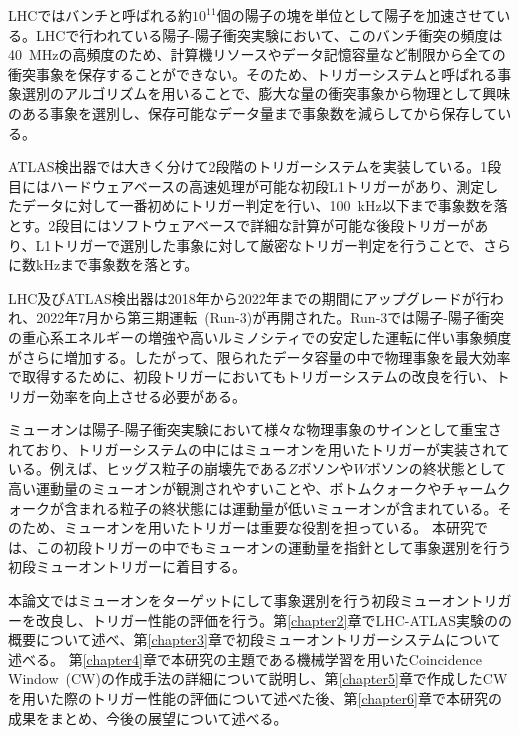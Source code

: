 LHCではバンチと呼ばれる約$10^{11}$個の陽子の塊を単位として陽子を加速させている。LHCで行われている陽子-陽子衝突実験において、このバンチ衝突の頻度は40~MHzの高頻度のため、計算機リソースやデータ記憶容量など制限から全ての衝突事象を保存することができない。そのため、トリガーシステムと呼ばれる事象選別のアルゴリズムを用いることで、膨大な量の衝突事象から物理として興味のある事象を選別し、保存可能なデータ量まで事象数を減らしてから保存している。

ATLAS検出器では大きく分けて2段階のトリガーシステムを実装している。1段目にはハードウェアベースの高速処理が可能な初段L1トリガーがあり、測定したデータに対して一番初めにトリガー判定を行い、100~kHz以下まで事象数を落とす。2段目にはソフトウェアベースで詳細な計算が可能な後段トリガーがあり、L1トリガーで選別した事象に対して厳密なトリガー判定を行うことで、さらに数kHzまで事象数を落とす。

LHC及びATLAS検出器は2018年から2022年までの期間にアップグレードが行われ、2022年7月から第三期運転~(Run-3)が再開された。Run-3では陽子-陽子衝突の重心系エネルギーの増強や高いルミノシティでの安定した運転に伴い事象頻度がさらに増加する。したがって、限られたデータ容量の中で物理事象を最大効率で取得するために、初段トリガーにおいてもトリガーシステムの改良を行い、トリガー効率を向上させる必要がある\cite{article:phase-1}。

ミューオンは陽子-陽子衝突実験において様々な物理事象のサインとして重宝されており、トリガーシステムの中にはミューオンを用いたトリガーが実装されている。例えば、ヒッグス粒子の崩壊先である$Z$ボソンや$W$ボソンの終状態として高い運動量のミューオンが観測されやすいことや、ボトムクォークやチャームクォークが含まれる粒子の終状態には運動量が低いミューオンが含まれている。そのため、ミューオンを用いたトリガーは重要な役割を担っている。
本研究では、この初段トリガーの中でもミューオンの運動量を指針として事象選別を行う初段ミューオントリガーに着目する。

本論文ではミューオンをターゲットにして事象選別を行う初段ミューオントリガーを改良し、トリガー性能の評価を行う。第\ref{chapter2}章でLHC-ATLAS実験のの概要について述べ、第\ref{chapter3}章で初段ミューオントリガーシステムについて述べる。
第\ref{chapter4}章で本研究の主題である機械学習を用いたCoincidence Window~(CW)の作成手法の詳細について説明し、第\ref{chapter5}章で作成したCWを用いた際のトリガー性能の評価について述べた後、第\ref{chapter6}章で本研究の成果をまとめ、今後の展望について述べる。


